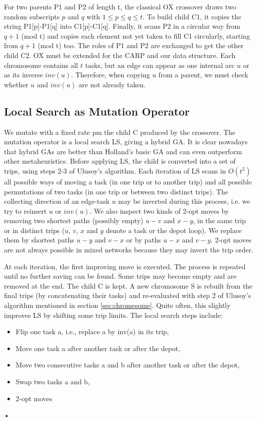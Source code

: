 \documentclass[journal,twoside,web]{ieeecolor}
\begin{document}
For two parents P1 and P2 of length t, the classical OX crossover draws two random subscripts $p$ and $q$ with $1\leq p \leq q \leq t$. To build child C1, it copies the string P1[p]-P1[q] into C1[p]-C1[q]. Finally, it scans P2 in a circular way from $q+1$ (mod t) and copies each element not yet taken to fill C1 circularly, starting from $q+1$ (mod t) too. The roles of P1 and P2 are exchanged to get the other child C2. OX must be
extended for the CARP and our data structure. Each chromosome contains all $t$ tasks,
but an edge can appear as one internal arc $u$ or as its inverse $inv(u)$. Therefore, when copying $u$ from a parent, we must check whether $u$ and $inv(u)$ are not already taken.
\subsection{Local Search as Mutation Operator}
We mutate with a fixed rate pm the child C produced by the crossover. The mutation
operator is a local search LS, giving a hybrid GA. It is clear nowadays that hybrid GAs
are better than Holland’s basic GA and can even outperform other metaheuristics.
Before applying LS, the child is converted into a set of trips, using steps 2-3 of
Ulusoy’s algorithm. Each iteration of LS scans in $O(t^2)$ all possible ways of moving a
task (in one trip or to another trip) and all possible permutations of two tasks (in one
trip or between two distinct trips). The collecting direction of an edge-task $u$ may be
inverted during this process, i.e. we try to reinsert $u$ or $inv(u)$. We also inspect two kinds of 2-opt moves by removing two shortest paths (possibly empty) $u-v$ and $x-y$, in the same trip or in distinct trips ($u$, $v$, $x$ and $y$ denote a task or the depot loop). We replace them by shortest paths $u-y$ and $v-x$ or by paths $u-x$ and $v-y$. 2-opt moves are not always possible in mixed networks because they may invert the trip order.\par
At each iteration, the first improving move is executed. The process is repeated
until no further saving can be found. Some trips may become empty and are removed
at the end. The child C is kept. A new chromosome S is rebuilt from the final trips (by
concatenating their tasks) and re-evaluated with step 2 of Ulusoy’s algorithm mentioned in section \ref{sec:chromesome}. Quite often, this slightly improves LS by shifting some trip limits.
The local search steps include:
\begin{itemize}
\item Flip one task a, i.e., replace a by inv(a) in its trip,
\item  Move one task a after another task or after the depot,
\item  Move two consecutive tasks a and b after another task or after the depot,
\item  Swap two tasks a and b,
\item  2-opt moves
\end{itemize}•
\end{document}
